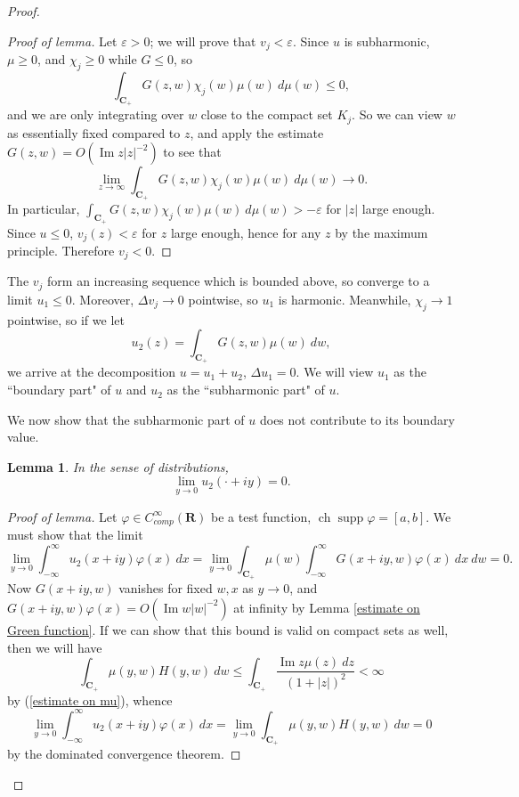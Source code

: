 \documentclass[12pt]{report}
\newcommand{\RR}{\mathbf{R}}
\newcommand{\CC}{\mathbf{C}}
\DeclareMathOperator{\ch}{ch}
\DeclareMathOperator{\supp}{supp}
\renewcommand{\Im}{\operatorname{Im}}
\newtheorem{lemma}[theorem]{Lemma}
\theoremstyle{definition}
\theoremstyle{remark}
\begin{document}
\begin{proof}
\begin{proof}[Proof of lemma]
    Let $\varepsilon > 0$; we will prove that $v_j < \varepsilon$. Since $u$ is subharmonic, $\mu \geq 0$, and $\chi_j \geq 0$ while $G \leq 0$, so
    $$\int_{\CC_+} G(z, w) \chi_j(w) \mu(w) ~d\mu(w) \leq 0,$$ and we are only integrating over $w$ close to the compact set $K_j$. So we can view $w$ as essentially fixed compared to $z$, and apply the estimate $G(z, w) = O(\Im z|z|^{-2})$ to see that
    $$\lim_{z \to \infty} \int_{\CC_+} G(z, w) \chi_j(w) \mu(w) ~d\mu(w) \to 0.$$
    In particular, $\int_{\CC_+} G(z, w) \chi_j(w) \mu(w) ~d\mu(w) > -\varepsilon$ for $|z|$ large enough. Since $u \leq 0$, $v_j(z) < \varepsilon$ for $z$ large enough, hence for any $z$ by the maximum principle. Therefore $v_j < 0$.
\end{proof}
    The $v_j$ form an increasing sequence which is bounded above, so converge to a limit $u_1 \leq 0$. Moreover, $\Delta v_j \to 0$ pointwise, so $u_1$ is harmonic. Meanwhile, $\chi_j \to 1$ pointwise, so if we let
$$u_2(z) = \int_{\CC_+} G(z, w) \mu(w) ~dw,$$
    we arrive at the decomposition $u = u_1 + u_2$, $\Delta u_1 = 0$. We will view $u_1$ as the ``boundary part" of $u$ and $u_2$ as the ``subharmonic part" of $u$.

    We now show that the subharmonic part of $u$ does not contribute to its boundary value.
\begin{lemma}
    In the sense of distributions,
$$\lim_{y \to 0} u_2(\cdot + iy) = 0.$$
\end{lemma}
\begin{proof}[Proof of lemma]
    Let $\varphi \in C^\infty_{comp}(\RR)$ be a test function, $\ch \supp \varphi = [a, b]$. We must show that the limit
$$\lim_{y \to 0} \int_{-\infty}^\infty u_2(x + iy) \varphi(x) ~dx = \lim_{y \to 0} \int_{\CC_+} \mu(w) \int_{-\infty}^\infty G(x + iy, w) \varphi(x) ~dx ~dw = 0.$$
    Now $G(x + iy, w)$ vanishes for fixed $w,x$ as $y \to 0$, and $G(x + iy, w) \varphi(x) = O(\Im w|w|^{-2})$ at infinity by Lemma \ref{estimate on Green function}. If we can show that this bound is valid on compact sets as well, then we will have
$$\int_{\CC_+} \mu(y, w) H(y, w) ~dw \leq \int_{\CC_+} \frac{\Im z \mu(z) ~dz}{(1 + |z|)^2} < \infty$$
    by (\ref{estimate on mu}), whence
$$\lim_{y \to 0} \int_{-\infty}^\infty u_2(x + iy) \varphi(x) ~dx = \lim_{y \to 0} \int_{\CC_+} \mu(y, w) H(y, w) ~dw = 0$$
    by the dominated convergence theorem.


\end{proof}
\end{proof}
\end{document}
